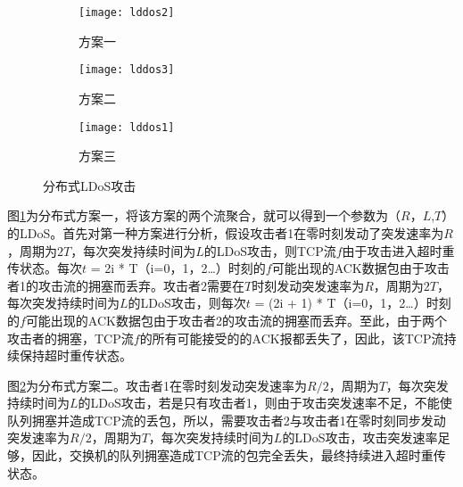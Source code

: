 \begin{figure}
    \vspace{-0.2in}
    \begin{subfigure}{1\textwidth}
        \centering
        \texttt{[image: lddos2]}
        \caption{方案一}
        \label{fig:lldos1}
    \end{subfigure}

    \begin{subfigure}{1\textwidth}
        \centering
        \texttt{[image: lddos3]}
        \caption{方案二}
        \label{fig:lldos2}
    \end{subfigure}

    \begin{subfigure}{1\textwidth}
        \centering
        \texttt{[image: lddos1]}
        \caption{方案三}
        \label{fig:lldos3}
    \end{subfigure}


    \caption{分布式LDoS攻击}
    \label{ffig:lldos}
\end{figure}


图\ref{fig:lldos1}为分布式方案一，将该方案的两个流聚合，就可以得到一个参数为（$R$，$L$,$T$）的LDoS。首先对第一种方案进行分析，假设攻击者1在零时刻发动了突发速率为$R$，周期为$2T$，每次突发持续时间为$L$的LDoS攻击，则TCP流$f$由于攻击进入超时重传状态。每次$t$ = 2i * T（i=0，1，2…）时刻的$f$可能出现的ACK数据包由于攻击者1的攻击流的拥塞而丢弃。攻击者2需要在$T$时刻发动突发速率为$R$，周期为$2T$，每次突发持续时间为$L$的LDoS攻击，则每次$t$ = (2i + 1) * T（i=0，1，2…）时刻的$f$可能出现的ACK数据包由于攻击者2的攻击流的拥塞而丢弃。至此，由于两个攻击者的拥塞，TCP流$f$的所有可能接受的的ACK报都丢失了，因此，该TCP流持续保持超时重传状态。


图\ref{fig:lldos2}为分布式方案二。攻击者1在零时刻发动突发速率为$R/2$，周期为$T$，每次突发持续时间为$L$的LDoS攻击，若是只有攻击者1，则由于攻击突发速率不足，不能使队列拥塞并造成TCP流的丢包，所以，需要攻击者2与攻击者1在零时刻同步发动突发速率为$R/2$，周期为$T$，每次突发持续时间为$L$的LDoS攻击，攻击突发速率足够，因此，交换机的队列拥塞造成TCP流的包完全丢失，最终持续进入超时重传状态。

